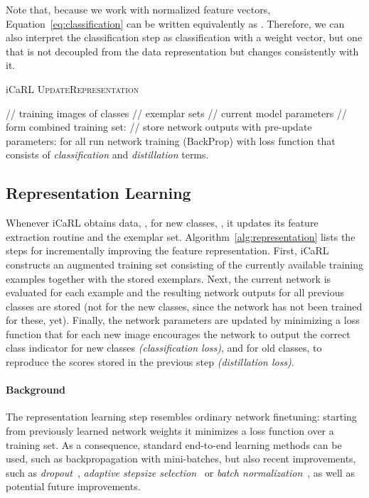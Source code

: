 \documentclass[10pt,twocolumn,letterpaper]{article}
\begin{document}
Note that, because we work with normalized feature vectors, Equation~\eqref{eq:classification} 
can be written equivalently as . 
Therefore, we can also interpret the classification step as 
classification with a weight vector, but one that is not 
decoupled from the data representation but changes consistently 
with it.

\begin{algorithm}[t]
\caption{iCaRL \textsc{UpdateRepresentation}}\label{alg:representation}
    \begin{algorithmic}
    \INPUT  \quad // training images of classes  
    \REQUIRE  \qquad\qquad // exemplar sets 
    \REQUIRE  \qquad\qquad // current model parameters 
\STATE // form combined training set:
{\small}
\STATE // store network outputs with pre-update parameters:
    \FOR{}
    \STATE  \quad for all 
    \ENDFOR
    \STATE run network training (\eg BackProp) with loss function
    {\small}
\STATE that consists of \emph{classification} and \emph{distillation} terms.
    \end{algorithmic}
\end{algorithm}

\subsection{Representation Learning}\label{subsec:representation}
Whenever iCaRL obtains data, , for new classes, 
, it updates its feature extraction routine and the exemplar set. 
Algorithm~\ref{alg:representation} lists the steps for 
incrementally improving the feature representation. 
First, iCaRL constructs an augmented training set consisting 
of the currently available training examples together with 
the stored exemplars. 
Next, the current network is evaluated for each example and 
the resulting network outputs for all previous classes are 
stored (not for the new classes, since the network has not 
been trained for these, yet).
Finally, the network parameters are updated by minimizing 
a loss function that for each new image encourages the 
network to output the correct class indicator for new 
classes \emph{(classification loss)}, and for old classes, 
to reproduce the scores stored in the previous step 
\emph{(distillation loss)}.

\paragraph{Background\onedot} 
The representation learning step resembles ordinary 
network finetuning: starting from previously learned 
network weights it minimizes a loss function over a 
training set.
As a consequence, standard end-to-end learning methods 
can be used, such as backpropagation with mini-batches, 
but also recent improvements, such as 
\emph{dropout}~\cite{SrivastavaHKSS14}, 
\emph{adaptive stepsize selection}~\cite{KingmaB14} or
\emph{batch normalization}~\cite{IoffeS15}, 
as well as potential future 
improvements. 
\end{document}
